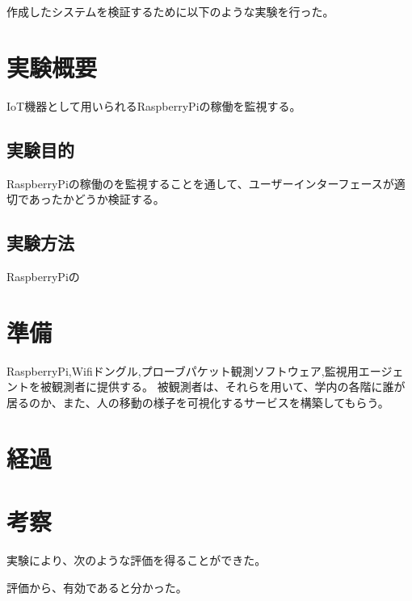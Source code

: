 作成したシステムを検証するために以下のような実験を行った。
\section{実験概要}
	IoT機器として用いられるRaspberryPiの稼働を監視する。
\subsection{実験目的}
	RaspberryPiの稼働のを監視することを通して、ユーザーインターフェースが適切であったかどうか検証する。
\subsection{実験方法}
	RaspberryPiの
\section{準備}
	RaspberryPi,Wifiドングル,プローブパケット観測ソフトウェア,監視用エージェントを被観測者に提供する。
	被観測者は、それらを用いて、学内の各階に誰が居るのか、また、人の移動の様子を可視化するサービスを構築してもらう。
\section{経過}
\section{考察}


実験により、次のような評価を得ることができた。

評価から、有効であると分かった。

